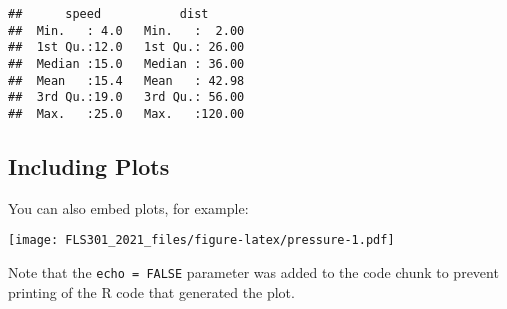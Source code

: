 \documentclass[
]{article}
\begin{document}
\begin{verbatim}
##      speed           dist       
##  Min.   : 4.0   Min.   :  2.00  
##  1st Qu.:12.0   1st Qu.: 26.00  
##  Median :15.0   Median : 36.00  
##  Mean   :15.4   Mean   : 42.98  
##  3rd Qu.:19.0   3rd Qu.: 56.00  
##  Max.   :25.0   Max.   :120.00
\end{verbatim}

\hypertarget{including-plots}{%
\subsection{Including Plots}\label{including-plots}}

You can also embed plots, for example:

\texttt{[image: FLS301\_2021\_files/figure-latex/pressure-1.pdf]}

Note that the \texttt{echo\ =\ FALSE} parameter was added to the code
chunk to prevent printing of the R code that generated the plot.
\end{document}
